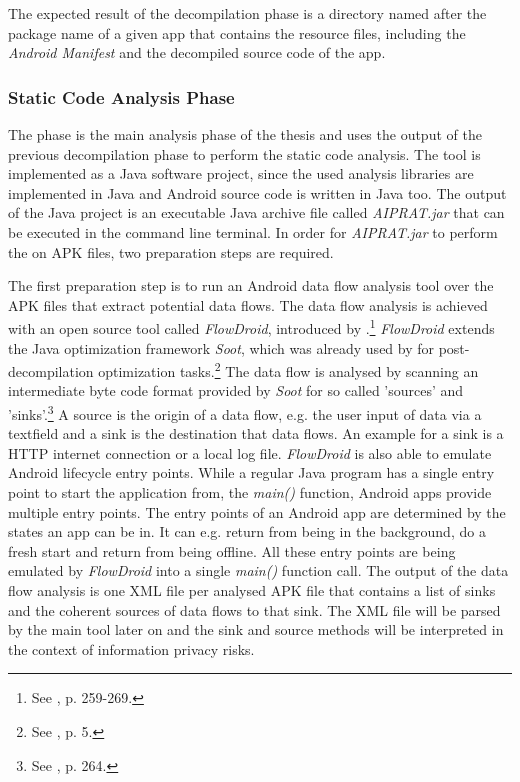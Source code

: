 The expected result of the decompilation phase is a directory named after the package name of a given app that contains the resource files, including the \textit{Android Manifest} and the decompiled source code of the app.

\subsubsection{Static Code Analysis Phase}

The \sca phase is the main analysis phase of the thesis and uses the output of the previous decompilation phase to perform the static code analysis.
The \sca tool is implemented as a Java software project, since the used analysis libraries are implemented in Java and Android source code is written in Java too.
The output of the \sca Java project is an executable Java archive file called \textit{AIPRAT.jar} that can be executed in the command line terminal.
In order for \textit{AIPRAT.jar} to perform the \sca on APK files, two preparation steps are required.

The first preparation step is to run an Android data flow analysis tool over the APK files that extract potential data flows.
The data flow analysis is achieved with an open source tool called \textit{FlowDroid}, introduced by \cite{Arzt2014}.\footnote{See \cite{Arzt2014}, p. 259-269.}
\textit{FlowDroid} extends the Java optimization framework \textit{Soot}, which was already used by \cite{Enck2011} for post-decompilation optimization tasks.\footnote{See \cite{Enck2011}, p. 5.}
The data flow is analysed by scanning an intermediate byte code format provided by \textit{Soot} for so called 'sources' and 'sinks'.\footnote{See \cite{Arzt2014}, p. 264.}
A source is the origin of a data flow, e.g. the user input of data via a textfield and a sink is the destination that data flows.
An example for a sink is a HTTP internet connection or a local log file.
\textit{FlowDroid} is also able to emulate Android lifecycle entry points.
While a regular Java program has a single entry point to start the application from, the \textit{main()} function, Android apps provide multiple entry points.
The entry points of an Android app are determined by the states an app can be in. 
It can e.g. return from being in the background, do a fresh start and return from being offline.
All these entry points are being emulated by \textit{FlowDroid} into a single \textit{main()} function call.
The output of the data flow analysis is one XML file per analysed APK file that contains a list of sinks and the coherent sources of data flows to that sink.
The XML file will be parsed by the main \sca tool later on and the sink and source methods will be interpreted in the context of information privacy risks.

